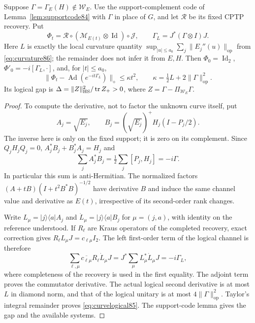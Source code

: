 \begin{lemma}
\label{lem:curvelogical85}
Suppose $\Gamma=\Gamma_E(H)\notin\mathcal W_E$.
Use the support-complement code of Lemma~\ref{lem:supportcode84}
with $\Gamma$ in place of $G$, and let $\mathcal R$ be its fixed
CPTP recovery.  Put
\[
 \Phi_t=\mathcal R\circ(\mathcal M_{E(t)}\otimes\operatorname{Id})
             \circ\mathcal J,\qquad
 \Gamma_L=J^*(\Gamma\otimes I)J.
\]
Here $L$ is exactly the local curvature quantity
$\sup_{|u|\le a_0}\sum_j\|E_j''(u)\|_{\mathrm{op}}$ from
\eqref{eq:curvature86}; the remainder does not infer it from $E,H$.
Then $\Phi_0=\operatorname{Id}_2$, $\Phi'_0=-i[\Gamma_L,\cdot]$,
and, for $|t|\le a_0$,
\begin{equation}\label{eq:curvelogical85}
 \|\Phi_t-\operatorname{Ad}(e^{-it\Gamma_L})\|_\diamond
 \le\kappa t^2,\qquad
 \kappa=\tfrac12L+2\|\Gamma\|_{\mathrm{op}}^2.
\end{equation}
Its logical gap is
$\Delta=\|Z\|_{\mathrm{HS}}^2/\operatorname{tr} Z_+>0$,
where $Z=\Gamma-\Pi_{\mathcal W_E}\Gamma$.
\end{lemma}
\begin{proof}
To compute the derivative, not to factor the unknown curve itself,
put
\[
 A_j=\sqrt{E_j},\qquad
 B_j=(\sqrt{E_j})^+H_j(I-P_j/2).
\]
The inverse here is only on the fixed support; it is zero on its
complement.  Since $Q_jH_jQ_j=0$,
$A_j^*B_j+B_j^*A_j=H_j$ and
\[
 \sum_j A_j^*B_j=\tfrac12\sum_j[P_j,H_j]=-i\Gamma.
\]
In particular this sum is anti-Hermitian.  The normalized factors
$(A+tB)(I+t^2B^*B)^{-1/2}$ have derivative $B$ and induce the
same channel value and derivative as $E(t)$, irrespective of its
second-order rank changes.

Write $L_\mu=|j\rangle\langle a|A_j$ and
$\dot L_\mu=|j\rangle\langle a|B_j$ for $\mu=(j,a)$,
with identity on the reference understood.  If $R_\ell$ are Kraus
operators of the completed recovery, exact correction gives
$R_\ell L_\mu J=c_{\ell\mu}I_2$.
The left first-order term of the logical channel is therefore
\[
 \sum_{\ell,\mu}\overline{c_{\ell\mu}}
                  R_\ell\dot L_\mu J
 =J^*\sum_\mu L_\mu^*\dot L_\mu J
 =-i\Gamma_L,
\]
where completeness of the recovery is used in the first equality.
The adjoint term proves the commutator derivative.  The actual
logical second derivative is at most $L$ in diamond norm, and that
of the logical unitary is at most $4\|\Gamma\|_{\mathrm{op}}^2$.
Taylor's integral remainder proves \eqref{eq:curvelogical85}.
The support-code lemma gives the gap and the available systems.
\end{proof}

